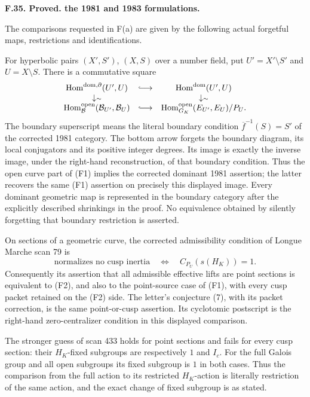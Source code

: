 \documentclass[11pt,oneside]{article}
\makeatletter
\newcounter{statementanchor}
\newenvironment{statement}[3]{%
 \refstepcounter{statementanchor}\def\@currentlabel{#1}%
 \par\addvspace{9pt}\noindent
 \textbf{#1. #2. #3.}\par\nobreak\noindent\ignorespaces
}{\par\addvspace{5pt}}
\makeatother
\begin{document}
\begin{statement}{F.35}{Proved}{the 1981 and 1983 formulations}
\label{st:F.35}
\label{F-manuscript-comparison}
The comparisons requested in F(a) are given by the following
actual forgetful maps, restrictions and identifications.

For hyperbolic pairs $(X',S')$, $(X,S)$ over a number field,
put $U'=X'\setminus S'$ and $U=X\setminus S$. There is a
commutative square
\[
\begin{array}{ccc}
 \operatorname{Hom}^{\rm dom,\partial}(U',U)&\lhook\joinrel\longrightarrow&
                 \operatorname{Hom}^{\rm dom}(U',U)\\
 \downarrow\scriptstyle\sim&&\downarrow\scriptstyle\sim\\
 \operatorname{Hom}^{\rm open}_{\mathcal B}(\mathcal B_{U'},\mathcal B_U)
       &\lhook\joinrel\longrightarrow&
 \operatorname{Hom}^{\rm open}_{G_K}(E_{U'},E_U)/P_U .
\end{array}
\]
The boundary superscript means the literal boundary condition
$\overline f^{-1}(S)=S'$ of the corrected 1981 category.
The bottom arrow forgets the boundary diagram, its local
conjugators and its positive integer degrees. Its image is
exactly the inverse image, under the right-hand reconstruction,
of that boundary condition. Thus the open curve part of (F1)
implies the corrected dominant 1981 assertion; the latter
recovers the same (F1) assertion on precisely this displayed
image. Every dominant geometric map is represented in the
boundary category after the explicitly described shrinkings
in the proof. No equivalence obtained by silently forgetting
that boundary restriction is asserted.

On sections of a geometric curve, the corrected admissibility
condition of Longue Marche scan 79 is
\[
 \text{normalizes no cusp inertia}
 \quad\Longleftrightarrow\quad C_{P_U}(s(H_K))=1.
\]
Consequently its assertion that all admissible effective lifts
are point sections is equivalent to (F2), and also to the
point-source case of (F1), with every cusp packet retained on
the (F2) side. The letter's conjecture (7), with its packet
correction, is the same point-or-cusp assertion. Its
cyclotomic postscript is the right-hand zero-centralizer
condition in this displayed comparison.

The stronger guess of scan 433 holds for point sections and
fails for every cusp section: their $H_K$-fixed subgroups are
respectively $1$ and $I_c$. For the full Galois group and all
open subgroups its fixed subgroup is $1$ in both cases.
Thus the comparison from the full action to its restricted
$H_K$-action is literally restriction of the same action,
and the exact change of fixed subgroup is as stated.


\end{statement}
\end{document}
